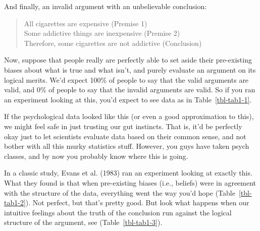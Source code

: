\documentclass[
  a4paper,
]{book}
\begin{document}
And finally, an invalid argument with an unbelievable conclusion:

\begin{quote}
All cigarettes are expensive (Premise 1)\\
Some addictive things are inexpensive (Premise 2)\\
Therefore, some cigarettes are not addictive (Conclusion)
\end{quote}

Now, suppose that people really are perfectly able to set aside their
pre-existing biases about what is true and what isn't, and purely
evaluate an argument on its logical merits. We'd expect 100\% of people
to say that the valid arguments are valid, and 0\% of people to say that
the invalid arguments are valid. So if you ran an experiment looking at
this, you'd expect to see data as in Table~\ref{tbl-tab1-1}.

\begin{table}

\caption{\label{tbl-tab1-1}Validity of arguments}

\centering
{}

\end{table}%

If the psychological data looked like this (or even a good approximation
to this), we might feel safe in just trusting our gut instincts. That
is, it'd be perfectly okay just to let scientists evaluate data based on
their common sense, and not bother with all this murky statistics stuff.
However, you guys have taken psych classes, and by now you probably know
where this is going.

In a classic study, Evans et al. (1983) ran an experiment looking at
exactly this. What they found is that when pre-existing biases (i.e.,
beliefs) were in agreement with the structure of the data, everything
went the way you'd hope (Table~\ref{tbl-tab1-2}). Not perfect, but
that's pretty good. But look what happens when our intuitive feelings
about the truth of the conclusion run against the logical structure of
the argument, see (Table~\ref{tbl-tab1-3}).
\end{document}
